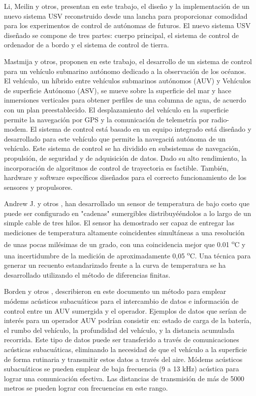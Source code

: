 Li, Meilin y otros\cite{li2012design}, presentan en este trabajo, el dise\~no y la implementaci\'on de un nuevo sistema USV reconstruido desde una lancha para proporcionar comodidad para los experimentos de control de aut\'onomas de futuros. El nuevo sistema USV dise\~nado se compone de tres partes: cuerpo principal, el sistema de control de ordenador de a bordo y el sistema de control de tierra. 

 Mastmija y otros\cite{masmitja2010development}, proponen en este trabajo, el desarrollo de un sistema de control para un veh\'iculo submarino autónomo dedicado a la observaci\'on de los oc\'eanos. El veh\'iculo, un h\'ibrido entre veh\'iculos submarinos aut\'onomos (AUV) y Veh\'iculos de superficie Aut\'onomo (ASV), se mueve sobre la superficie del mar y hace inmersiones verticales para obtener perfiles de una columna de agua, de acuerdo con un plan preestablecido. El desplazamiento del veh\'iculo en la superficie permite la navegaci\'on por GPS y la comunicaci\'on de telemetr\'ia por radio-modem. El sistema de control est\'a basado en un equipo integrado est\'a dise\~nado y desarrollado para este veh\'iculo que permite la navegaci\'n aut\'onoma de un veh\'iculo. Este sistema de control se ha dividido en subsistemas de navegaci\'on, propulsi\'on, de seguridad y de adquisici\'on de datos. Dado su alto rendimiento, la incorporaci\'on de algoritmos de control de trayectoria es factible. Tambi\'en, hardware y software espec\'ificos dise\~nados para el correcto funcionamiento de los sensores y propulsores.

Andrew J. y otros \cite{skinner2006using}, han desarrollado un sensor de temperatura de bajo costo que puede ser configurado en "cadenas" sumergibles distribuyé\'endolos a lo largo de un simple cable de tres hilos. El sensor ha demostrado ser capaz de entregar las mediciones de temperatura altamente coincidentes simult\'aneas a una resoluci\'on de unas pocas mil\'esimas de un grado, con una coincidencia mejor que 0.01  \textsuperscript{o}C y una incertidumbre de la medici\'on de aproximadamente 0,05  \textsuperscript{o}C. Una t\'ecnica para generar un recuento estandarizado frente a la curva de temperatura se ha desarrollado utilizando el m\'etodo de diferencias finitas.

Borden  y otros \cite{borden2012long},  describieron en este documento un m\'etodo para emplear m\'odems ac\'usticos subacu\'aticos para el intercambio de datos e informaci\'on  de control entre un AUV sumergida y el operador. Ejemplos de datos que ser\'ian de  inter\'es para un operador AUV podr\'ian consistir en: estado de carga de la bater\'ia, el rumbo del veh\'iculo, la profundidad del veh\'iculo, y la distancia acumulada recorrida. Este  tipo de datos puede ser transferido a través de comunicaciones acústicas subacu\'aticas, eliminando la  necesidad de que el veh\'iculo a la superficie de forma rutinaria y transmitir estos datos a trav\'es del aire. M\'odems ac\'usticos subacuáticos se pueden emplear de baja frecuencia (9 a 13 kHz) ac\'ustica para lograr  una comunicación efectiva. Las distancias de transmisi\'on de m\'as de 5000 metros se  pueden lograr con frecuencias en este rango.


